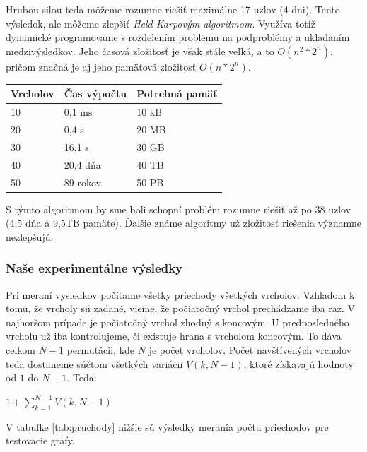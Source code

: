 \documentclass[a4paper,11pt, titlepage]{article}
\begin{document}
Hrubou silou teda môžeme rozumne riešiť maximálne 17 uzlov (4 dni). Tento výsledok, ale môžeme zlepšiť \emph{Held-Karpovým algoritmom}. Využíva totiž dynamické programovanie s rozdelením problému na podproblémy a ukladaním medzivýsledkov. Jeho časová zložitosť je však stále veľká, a to $O(n^2 * 2^n)$, pričom značná je aj jeho pamäťová zložitosť $O(n * 2^n)$.

\begin{table}[h]
\centering
\begin{tabular}{|l|l|l|}
\hline
Vrcholov & Čas výpočtu & Potrebná pamäť \\ \hline
10       & 0,1 ms      & 10 kB          \\ \hline
20       & 0,4 s       & 20 MB          \\ \hline
30       & 16,1 s      & 30 GB          \\ \hline
40       & 20,4 dňa    & 40 TB          \\ \hline
50       & 89 rokov    & 50 PB          \\ \hline
\end{tabular}
\end{table}

S týmto algoritmom by sme boli schopní problém rozumne riešiť až po 38 uzlov (4,5 dňa a 9,5TB pamäte). Ďalšie známe algoritmy už zložitosť riešenia významne nezlepšujú.

\subsubsection{Naše experimentálne výsledky}

Pri meraní vysledkov počítame všetky priechody všetkých vrcholov. Vzhľadom k tomu, že vrcholy sú zadané, vieme, že počiatočný vrchol prechádzame iba raz. V najhoršom prípade je počiatočný vrchol zhodný s koncovým. U predposledného vrcholu už iba kontrolujeme, či existuje hrana s vrcholom koncovým. To dáva celkom $N-1$ permutácii, kde $N$ je počet vrcholov. Počet navštívených vrcholov teda dostaneme súčtom všetkých variácii $V(k,N-1)$, ktoré získavajú hodnoty od $1$ do $N-1$. 
Teda:\\

\vspace{0.5cm}

\centerline {{\Large \textbf {$1+\sum_{k=1}^{N-1}{V(k, N-1)}$}}} \label{variace}

\vspace{0.5cm}

V tabuľke \ref{tab:pruchody} nižšie sú výsledky merania počtu priechodov pre testovacie grafy.
\end{document}

